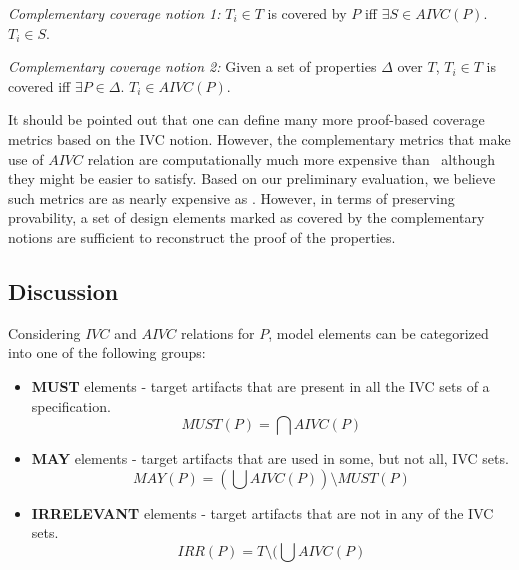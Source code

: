 \begin{definition} {\emph{Complementary coverage notion 1:}}
  \label{def:comp-1}
   $T_i \in T$ is covered by $P$ iff $ \exists S
   \in AIVC(P)$. $T_i \in S$.
\end{definition}

\begin{definition} {\emph{Complementary coverage notion 2:}}
  \label{def:comp-2}
   Given a set of properties $\Delta$ over $T$, $T_i \in T$ is covered iff $\exists P \in \Delta$. $T_i \in AIVC(P)$.
\end{definition}

It should be pointed out that one can define many more proof-based coverage metrics based on the IVC notion. However, the complementary metrics that make use of $AIVC$ relation are computationally much more expensive than \ivccov\ although they might be easier to satisfy. Based on our preliminary evaluation, we believe such metrics are as nearly expensive as \nondetcov. However, in terms of preserving provability, a set of design elements marked as covered by the complementary notions are
sufficient to reconstruct the proof of the properties.


\subsection{Discussion}
\label{subsec:method-disc}

Considering $IVC$ and $AIVC$ relations for $P$, model elements can be categorized into one of the following groups:

\begin{itemize}
  \item \textbf{MUST} elements - target artifacts that are present in all the IVC sets of a specification.
      \[
      MUST (P) = \bigcap AIVC(P)
      \]

  \item \textbf{MAY} elements - target artifacts that are used in some, but not all, IVC sets.
      \[
      MAY(P) = (\bigcup AIVC (P)) \setminus MUST (P)
      \]

  \item \textbf{IRRELEVANT} elements - target artifacts that are not in any of the IVC sets.
  $$IRR(P) = T \setminus (\bigcup AIVC (P)$$
\end{itemize}

